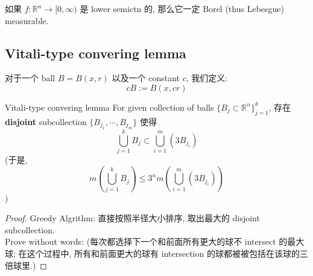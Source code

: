 \documentclass[lang=cn,11pt]{elegantbook}
\begin{document}
\begin{corollary}
    如果 $f:\mathbb{R}^n \to [0,\infty)$ 是 lower semictn 的, 那么它一定 Borel (thus Lebesgue) measurable.
\end{corollary}




\subsection{Vitali-type convering lemma}
对于一个 ball $B = B(x,r)$ 以及一个 constant $c$, 我们定义: \[
cB := B(x,cr)
\]
\begin{lemma}{Vitali-type convering lemma}
    For given collection of balls $\{B_j \subset \mathbb{R}^n\}_{j=1}^k$, 存在 \textbf{disjoint} subcollection $\{B_{j_1},\cdots, B_{j_m}\}$ 使得\[
\bigcup_{j=1}^k B_j  \subset \bigcup_{i=1}^m (3B_{j_i}) 
    \]
    (于是, \[
    m(\bigcup_{j=1}^k B_j) \leq 3^n m(\bigcup_{i=1}^m (3B_{j_i}))
    \])
\end{lemma}
\begin{proof}
    Greedy Algrithm: 直接按照半径大小排序, 取出最大的 disjoint subcollection.\\
    Prove without words: 
    (每次都选择下一个和前面所有更大的球不 intersect 的最大球; 在这个过程中, 所有和前面更大的球有 intersection 的球都被被包括在该球的三倍球里.)
\end{proof}
\end{document}
